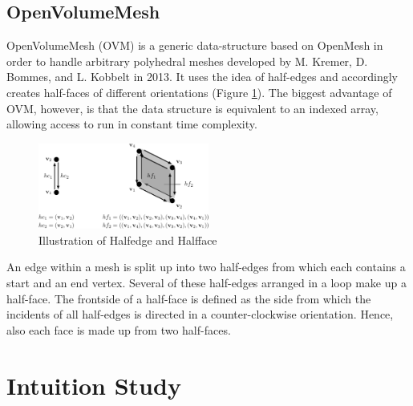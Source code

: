 \documentclass{report}
\begin{document}
	\section[OpenVolumeMesh]{OpenVolumeMesh \textsc{\small{\cite{OVM}}}} \label{OpenVolumeMesh}
	\startsection
		OpenVolumeMesh (OVM) is a generic data-structure based on OpenMesh in order to handle arbitrary polyhedral meshes developed by M. Kremer, D. Bommes, and L. Kobbelt in 2013. It uses the idea of half-edges and accordingly creates half-faces of different orientations (Figure \ref{HalfedgeHalfface}). The biggest advantage of OVM, however, is that the data structure is equivalent to an indexed array, allowing access to run in constant time complexity.
		\begin{figure}[H]
			\begin{center}
				\includegraphics[width=0.5\textwidth]{halfedge_halfface.png} 
				\caption{Illustration of Halfedge and Halfface}
				\label{HalfedgeHalfface}
			\end{center}
		\end{figure}
		\noindent An edge within a mesh is split up into two half-edges from which each contains a start and an end vertex. Several of these half-edges arranged in a loop make up a half-face. The frontside of a half-face is defined as the side from which the incidents of all half-edges is directed in a counter-clockwise orientation. Hence, also each face is made up from two half-faces.
	\closesection

\chapter{Intuition Study}
	
\end{document}
